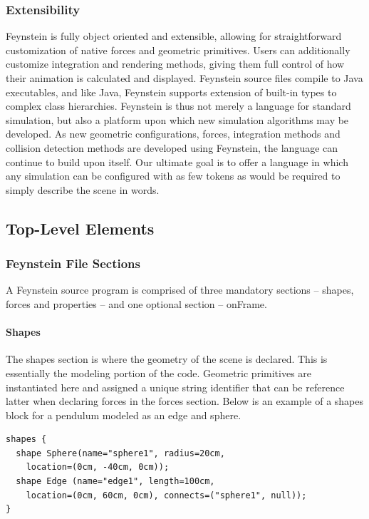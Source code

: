 \subsubsection{Extensibility}
Feynstein is fully object oriented and extensible, allowing for
straightforward customization of native forces and geometric
primitives. Users can additionally customize integration and rendering
methods, giving them full control of how their animation is calculated
and displayed.  Feynstein source files compile to Java executables,
and like Java, Feynstein supports extension of built-in types to
complex class hierarchies. Feynstein is thus not merely a language for
standard simulation, but also a platform upon which new simulation
algorithms may be developed.  As new geometric configurations, forces,
integration methods and collision detection methods are developed
using Feynstein, the language can continue to build upon itself. Our
ultimate goal is to offer a language in which any simulation can be
configured with as few tokens as would be required to simply describe
the scene in words.


\subsection{Top-Level Elements}

\subsubsection{Feynstein File Sections}
 
A Feynstein source program is comprised of three mandatory sections --
shapes, forces and properties -- and one optional section -- onFrame.
 
\paragraph{Shapes}
\label{sec:shapes}
The shapes section is where the geometry of the scene is
declared. This is essentially the modeling portion of the
code. Geometric primitives are instantiated here and assigned a unique
string identifier that can be reference latter when declaring forces
in the forces section. Below is an example of a shapes block for a
pendulum modeled as an edge and sphere.

\begin{verbatim}
shapes {
  shape Sphere(name="sphere1", radius=20cm, 
    location=(0cm, -40cm, 0cm));
  shape Edge (name="edge1", length=100cm, 
    location=(0cm, 60cm, 0cm), connects=("sphere1", null));
}
\end{verbatim}
 
